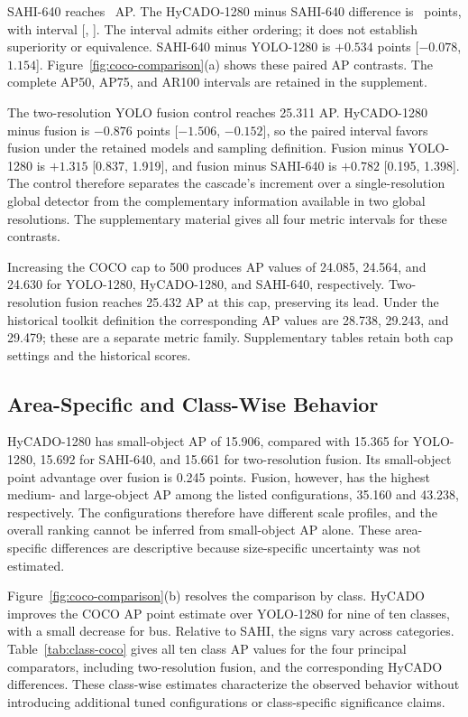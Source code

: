 \documentclass[journal]{IEEEtran}
\begin{document}
SAHI-640 reaches \CocoS\ AP. The HyCADO-1280 minus SAHI-640 difference is \CocoHS\ points, with interval [\CocoHSLow, \CocoHSHigh]. The interval admits either ordering; it does not establish superiority or equivalence. SAHI-640 minus YOLO-1280 is $+0.534$ points [$-0.078$, $1.154$]. Figure~\ref{fig:coco-comparison}(a) shows these paired AP contrasts. The complete AP50, AP75, and AR100 intervals are retained in the supplement.

The two-resolution YOLO fusion control reaches 25.311 AP. HyCADO-1280 minus fusion is $-0.876$ points [$-1.506$, $-0.152$], so the paired interval favors fusion under the retained models and sampling definition. Fusion minus YOLO-1280 is $+1.315$ [0.837, 1.919], and fusion minus SAHI-640 is $+0.782$ [0.195, 1.398]. The control therefore separates the cascade's increment over a single-resolution global detector from the complementary information available in two global resolutions. The supplementary material gives all four metric intervals for these contrasts.

Increasing the COCO cap to 500 produces AP values of 24.085, 24.564, and 24.630 for YOLO-1280, HyCADO-1280, and SAHI-640, respectively. Two-resolution fusion reaches 25.432 AP at this cap, preserving its lead. Under the historical toolkit definition the corresponding AP values are 28.738, 29.243, and 29.479; these are a separate metric family. Supplementary tables retain both cap settings and the historical scores.

\subsection{Area-Specific and Class-Wise Behavior}
HyCADO-1280 has small-object AP of 15.906, compared with 15.365 for YOLO-1280, 15.692 for SAHI-640, and 15.661 for two-resolution fusion. Its small-object point advantage over fusion is 0.245 points. Fusion, however, has the highest medium- and large-object AP among the listed configurations, 35.160 and 43.238, respectively. The configurations therefore have different scale profiles, and the overall ranking cannot be inferred from small-object AP alone. These area-specific differences are descriptive because size-specific uncertainty was not estimated.

Figure~\ref{fig:coco-comparison}(b) resolves the comparison by class. HyCADO improves the COCO AP point estimate over YOLO-1280 for nine of ten classes, with a small decrease for bus. Relative to SAHI, the signs vary across categories. Table~\ref{tab:class-coco} gives all ten class AP values for the four principal comparators, including two-resolution fusion, and the corresponding HyCADO differences. These class-wise estimates characterize the observed behavior without introducing additional tuned configurations or class-specific significance claims.
\end{document}
